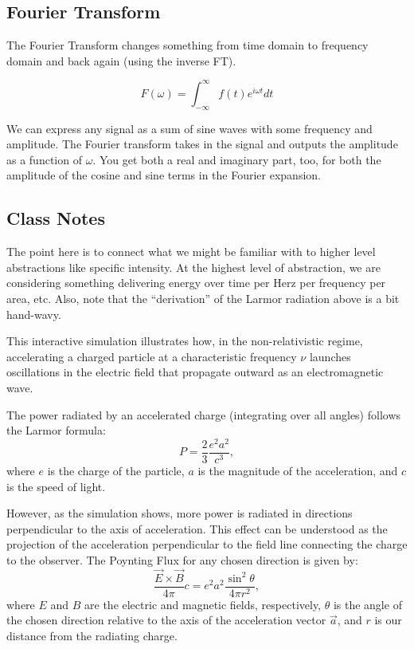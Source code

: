 \documentclass{article}
\begin{document}
\subsection{Fourier Transform}

The Fourier Transform changes something from time domain to frequency domain and back again (using the inverse FT). 

\begin{equation}
    F(\omega) = \int_{-\infty}^{\infty} f(t) e^{i \omega t} dt
\end{equation}

We can express any signal as a sum of sine waves with some frequency and amplitude. The Fourier transform takes in the signal and outputs the amplitude as a function of $\omega$. You get both a real and imaginary part, too, for both the amplitude of the cosine and sine terms in the Fourier expansion.\\

\subsection{Class Notes}

The point here is to connect what we might be familiar with to higher level abstractions like specific intensity. At the highest level of abstraction, we are considering something delivering energy over time per Herz per frequency per area, etc. Also, note that the ``derivation'' of the Larmor radiation above is a bit hand-wavy.  

This interactive simulation illustrates how, in the non-relativistic regime,
accelerating a charged particle at a characteristic frequency $\nu$ launches
oscillations in the electric field that propagate outward as an electromagnetic
wave.

The power radiated by an accelerated charge (integrating over all angles) follows the Larmor formula:
\begin{equation}
P = \frac{2}{3}\frac{e^2 a^2}{c^3},
\end{equation}
where $e$ is the charge of the particle, $a$ is the magnitude of the acceleration, and $c$ is the speed of light.

However, as the simulation shows, more power is radiated in directions perpendicular to the axis of acceleration.
This effect can be understood as the projection of the acceleration perpendicular to the field line connecting the charge to the observer. The Poynting Flux for any chosen direction is given by:
\begin{equation}
\frac{\vec E\times\vec B}{4\pi}c=e^2a^2\frac{\sin^2\theta}{4\pi r^2},
\end{equation}
where $E$ and $B$ are the electric and magnetic fields, respectively, $\theta$ is the angle of the chosen direction relative to the axis of the acceleration vector $\vec a$,
and $r$ is our distance from the radiating charge.
\end{document}

